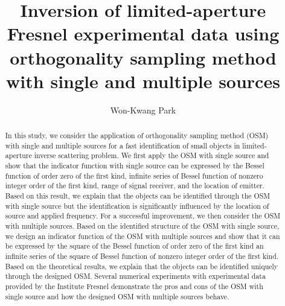 \documentclass[3p,10pt]{elsarticle}
\theoremstyle{plain}
\theoremstyle{remark}
\begin{document}
\begin{frontmatter}



\title{Inversion of limited-aperture Fresnel experimental data using orthogonality sampling method with single and multiple sources}

\author{Won-Kwang Park}
\address{Department of Information Security, Cryptography, and Mathematics, Kookmin University, Seoul, 02707, Korea}

\begin{abstract}
In this study, we consider the application of orthogonality sampling method (OSM) with single and multiple sources for a fast identification of small objects in limited-aperture inverse scattering problem. We first apply the OSM with single source and show that the indicator function with single source can be expressed by the Bessel function of order zero of the first kind, infinite series of Bessel function of nonzero integer order of the first kind, range of signal receiver, and the location of emitter. Based on this result, we explain that the objects can be identified through the OSM with single source but the identification is significantly influenced by the location of source and applied frequency. For a successful improvement, we then consider the OSM with multiple sources. Based on the identified structure of the OSM with single source, we design an indicator function of the OSM with multiple sources and show that it can be expressed by the square of the Bessel function of order zero of the first kind an infinite series of the square of Bessel function of nonzero integer order of the first kind. Based on the theoretical results, we explain that the objects can be identified uniquely through the designed OSM. Several numerical experiments with experimental data provided by the Institute Fresnel demonstrate the pros and cons of the OSM with single source and how the designed OSM with multiple sources behave.
\end{abstract}


\end{frontmatter}
\end{document}
